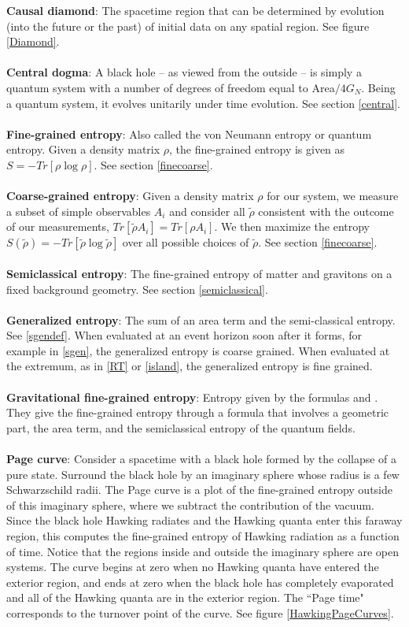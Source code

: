 {\bf Causal diamond}: The spacetime region that can be determined by evolution (into the future or the past) of initial data on any spatial region.  See figure \ref{Diamond}. \\
\\
{\bf Central dogma}: A black hole -- as viewed from the outside -- is simply a quantum system with a number of degrees of freedom equal to Area$/4G_N$. Being a quantum system, it evolves unitarily under time evolution. See section \ref{central}. \\
\\
{\bf Fine-grained entropy}: Also called the von Neumann entropy or quantum entropy. Given a density matrix $\rho$, the fine-grained entropy is given as $S = -Tr[\rho \log \rho]$. See section \ref{finecoarse}.\\
\\
{\bf Coarse-grained entropy}: Given a density matrix $\rho$ for our system, we measure a subset of simple observables $A_i$ and consider all $\tilde{\rho}$ consistent with the outcome of our measurements, $Tr[\tilde{\rho} A_i] = Tr[\rho A_i]$. We then maximize the entropy $S(\tilde{\rho}) = -Tr[\tilde{\rho} \log \tilde{\rho}]$ over all possible choices of $\tilde{\rho}$. See section \ref{finecoarse}. \\
\\
{\bf Semiclassical entropy}: The fine-grained entropy of matter and gravitons on a fixed background geometry. See section \ref{semiclassical}. \\
\\
{\bf Generalized entropy}: The sum of an area term and the semi-classical entropy.  See \eqref{sgendef}. When evaluated at an event horizon soon after it forms, for example in \eqref{sgen}, the generalized entropy is coarse grained. When evaluated at the extremum, as in \eqref{RT} or \eqref{island}, the generalized entropy is fine grained. \\
\\
{\bf Gravitational fine-grained entropy}: Entropy given by the formulas  and . They give the fine-grained entropy through a formula that involves a geometric part, the area term, and the semiclassical entropy of the quantum fields.  \\
\\
{\bf Page curve}: Consider a spacetime with a black hole formed by the collapse of a pure state. Surround the black hole by an imaginary sphere whose radius is a few Schwarzschild radii. The Page curve is a plot of the fine-grained entropy outside of this imaginary sphere, where we subtract the contribution of the vacuum. Since the black hole Hawking radiates and the Hawking quanta enter this faraway region, this computes the fine-grained entropy of Hawking radiation as a function of time. Notice that the regions inside and outside the imaginary sphere are open systems. The curve begins at zero when no Hawking quanta have entered the exterior region, and ends at zero when the black hole has completely evaporated and all of the Hawking quanta are in the exterior region. The ``Page time" corresponds to the turnover point of the curve. See figure \ref{HawkingPageCurves}.\\
